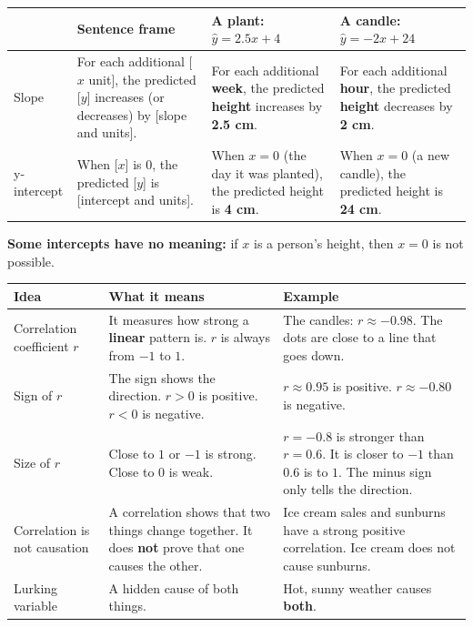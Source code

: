 \documentclass[11pt]{article}
\newcommand{\sumhead}[1]{\par\vspace{0.7em}{\large\bfseries #1}\par\vspace{0.3em}}
\begin{document}
\sumhead{Slope and Intercept in Context}
\begin{tabular}{|L{0.8in}|L{2.1in}|L{1.7in}|L{1.7in}|}\hline
 & \textbf{Sentence frame} & \textbf{A plant: $\hat{y} = 2.5x + 4$} & \textbf{A candle: $\hat{y} = -2x + 24$}\\ \hline
Slope & For each additional [$x$ unit], the predicted [$y$] increases (or decreases) by [slope and units]. & For each additional \textbf{week}, the predicted \textbf{height} increases by \textbf{2.5 cm}. & For each additional \textbf{hour}, the predicted \textbf{height} decreases by \textbf{2 cm}.\\ \hline
y-intercept & When [$x$] is 0, the predicted [$y$] is [intercept and units]. & When $x = 0$ (the day it was planted), the predicted height is \textbf{4 cm}. & When $x = 0$ (a new candle), the predicted height is \textbf{24 cm}.\\ \hline
\end{tabular}

\vspace{0.3em}
\textbf{Some intercepts have no meaning:} if $x$ is a person's height, then $x = 0$ is not possible.

\newpage
\sumhead{Correlation and Causation}
\begin{tabular}{|L{1.2in}|L{2.75in}|L{2.5in}|}\hline
\textbf{Idea} & \textbf{What it means} & \textbf{Example}\\ \hline
Correlation coefficient $r$ & It measures how strong a \textbf{linear} pattern is. $r$ is always from $-1$ to $1$. & The candles: $r \approx -0.98$. The dots are close to a line that goes down.\\ \hline
Sign of $r$ & The sign shows the direction. $r > 0$ is positive. $r < 0$ is negative. & $r \approx 0.95$ is positive. $r \approx -0.80$ is negative.\\ \hline
Size of $r$ & Close to $1$ or $-1$ is strong. Close to $0$ is weak. & $r = -0.8$ is stronger than $r = 0.6$. It is closer to $-1$ than $0.6$ is to $1$. The minus sign only tells the direction.\\ \hline
Correlation is not causation & A correlation shows that two things change together. It does \textbf{not} prove that one causes the other. & Ice cream sales and sunburns have a strong positive correlation. Ice cream does not cause sunburns.\\ \hline
Lurking variable & A hidden cause of both things. & Hot, sunny weather causes \textbf{both}.\\ \hline
\end{tabular}
\end{document}
